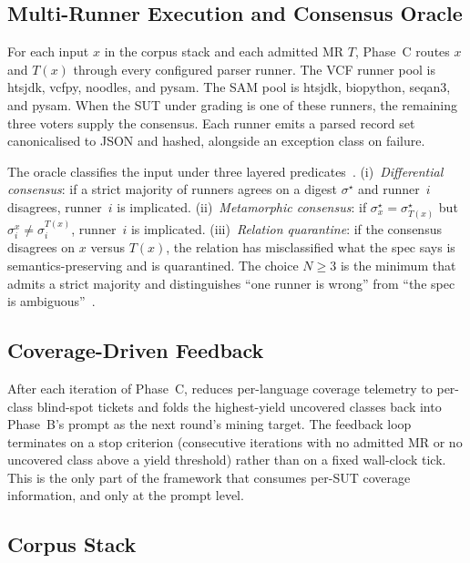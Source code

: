 \subsection{Multi-Runner Execution and Consensus Oracle}
\label{sec:design-phase-c}
\label{sec:design-consensus}

For each input $x$ in the corpus stack and each admitted MR $T$,
Phase~C routes $x$ and $T(x)$ through every configured parser
runner. The VCF runner pool is htsjdk, vcfpy, noodles, and pysam.
The SAM pool is htsjdk, biopython, seqan3, and pysam. When the
SUT under grading is one of these runners, the remaining three
voters supply the consensus. Each runner emits a parsed record
set canonicalised to JSON and hashed, alongside an exception
class on failure.

The oracle classifies the input under three layered
predicates~\citep{mckeeman1998differential}.
(i)~\emph{Differential consensus}: if a strict majority of
runners agrees on a digest $\sigma^\star$ and runner~$i$
disagrees, runner~$i$ is implicated.
(ii)~\emph{Metamorphic consensus}: if
$\sigma^\star_x = \sigma^\star_{T(x)}$ but
$\sigma_i^x \ne \sigma_i^{T(x)}$, runner~$i$ is implicated.
(iii)~\emph{Relation quarantine}: if the consensus disagrees on
$x$ versus $T(x)$, the relation has misclassified what the spec
says is semantics-preserving and is quarantined. The choice
$N\ge 3$ is the minimum that admits a strict majority and
distinguishes ``one runner is wrong'' from ``the spec is
ambiguous''~\citep{barr2015oracle}.

\subsection{Coverage-Driven Feedback}
\label{sec:design-phase-d}

After each iteration of Phase~C, \biotest{} reduces per-language
coverage telemetry to per-class blind-spot tickets and folds the
highest-yield uncovered classes back into Phase~B's prompt as the
next round's mining target. The feedback loop terminates on a
stop criterion (consecutive iterations with no admitted MR or no
uncovered class above a yield threshold) rather than on a fixed
wall-clock tick. This is the only part of the framework that
consumes per-SUT coverage information, and only at the prompt
level.

\subsection{Corpus Stack}
\label{sec:design-corpus}

